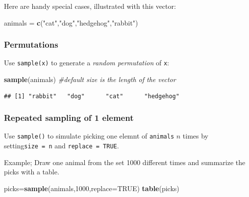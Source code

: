 \documentclass[
]{book}
\newenvironment{Shaded}{\begin{snugshade}}{\end{snugshade}}
\newcommand{\AttributeTok}[1]{\textcolor[rgb]{0.13,0.29,0.53}{#1}}
\newcommand{\CommentTok}[1]{\textcolor[rgb]{0.56,0.35,0.01}{\textit{#1}}}
\newcommand{\ConstantTok}[1]{\textcolor[rgb]{0.56,0.35,0.01}{#1}}
\newcommand{\DecValTok}[1]{\textcolor[rgb]{0.00,0.00,0.81}{#1}}
\newcommand{\FunctionTok}[1]{\textcolor[rgb]{0.13,0.29,0.53}{\textbf{#1}}}
\newcommand{\NormalTok}[1]{#1}
\newcommand{\OtherTok}[1]{\textcolor[rgb]{0.56,0.35,0.01}{#1}}
\newcommand{\StringTok}[1]{\textcolor[rgb]{0.31,0.60,0.02}{#1}}
\theoremstyle{definition}
\theoremstyle{definition}
\theoremstyle{definition}
\theoremstyle{definition}
\theoremstyle{remark}
\begin{document}
Here are handy special cases, illustrated with this vector:

\begin{Shaded}
\begin{Highlighting}[]
\NormalTok{animals }\OtherTok{=} \FunctionTok{c}\NormalTok{(}\StringTok{"cat"}\NormalTok{,}\StringTok{"dog"}\NormalTok{,}\StringTok{"hedgehog"}\NormalTok{,}\StringTok{"rabbit"}\NormalTok{)}
\end{Highlighting}
\end{Shaded}

\subsubsection*{Permutations}\label{permutations-1}

Use \texttt{sample(x)} to generate a \emph{random permutation} of \texttt{x}:

\begin{Shaded}
\begin{Highlighting}[]
\FunctionTok{sample}\NormalTok{(animals) }\CommentTok{\#default size is the length of the vector}
\end{Highlighting}
\end{Shaded}

\begin{verbatim}
## [1] "rabbit"   "dog"      "cat"      "hedgehog"
\end{verbatim}

\subsubsection*{Repeated sampling of 1 element}\label{repeated-sampling-of-1-element}

Use \texttt{sample()} to simulate picking one elemnt of \texttt{animals} \(n\) times by setting\texttt{size\ =\ n} and \texttt{replace\ =\ TRUE}.

Example; Draw one animal from the set 1000 different times and summarize the picks with a table.

\begin{Shaded}
\begin{Highlighting}[]
\NormalTok{picks}\OtherTok{=}\FunctionTok{sample}\NormalTok{(animals,}\DecValTok{1000}\NormalTok{,}\AttributeTok{replace=}\ConstantTok{TRUE}\NormalTok{) }
\FunctionTok{table}\NormalTok{(picks) }
\end{Highlighting}
\end{Shaded}
\end{document}

